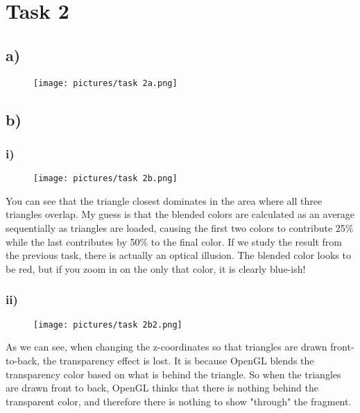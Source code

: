 \section{Task 2}

\subsection{a)}
\begin{figure}[h!]
    \centering
    \texttt{[image: pictures/task 2a.png]}
\end{figure}

\subsection{b)}
\subsubsection{i)}
\begin{figure}[H]
    \centering
    \texttt{[image: pictures/task 2b.png]}
\end{figure}
You can see that the triangle closest dominates in the area where all three triangles overlap. My guess is that the blended colors are calculated as an average sequentially as triangles are loaded, causing the first two colors to contribute 25\% while the last contributes by 50\% to the final color.
If we study the result from the previous task, there is actually an optical illusion. The blended color looks to be red, but if you zoom in on the only that color, it is clearly blue-ish!

\subsubsection{ii)}
\begin{figure}[h!]
    \centering
    \texttt{[image: pictures/task 2b2.png]}
\end{figure}
As we can see, when changing the z-coordinates so that triangles are drawn front-to-back, the transparency effect is lost. It is because OpenGL blends the transparency color based on what is behind the triangle. So when the triangles are drawn front to back, OpenGL thinks that there is nothing behind the transparent color, and therefore there is nothing to show "through" the fragment. 




        

